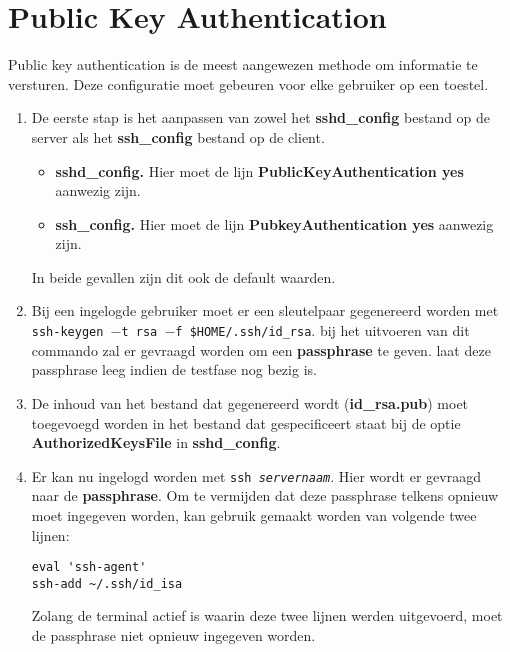 \documentclass{report}
\begin{document}
	\section{Public Key Authentication}
	Public key authentication is de meest aangewezen methode om informatie te versturen. Deze configuratie moet gebeuren voor elke gebruiker op een toestel.
	\begin{enumerate}
		\item De eerste stap is het aanpassen van zowel het \textbf{sshd\_config} bestand op de server als het \textbf{ssh\_config} bestand op de client.
		\begin{itemize}
			\item \textbf{sshd\_config.} Hier moet de lijn \textbf{PublicKeyAuthentication  yes} aanwezig zijn. 
			\item \textbf{ssh\_config.} Hier moet de lijn \textbf{PubkeyAuthentication  yes} aanwezig zijn.
		\end{itemize}
		In beide gevallen zijn dit ook de default waarden.
		\item Bij een ingelogde gebruiker moet er een sleutelpaar gegenereerd worden met \texttt{ssh-keygen $-$t rsa $-$f \$HOME/.ssh/id\_rsa}. bij het uitvoeren van dit commando zal er gevraagd worden om een \textbf{passphrase} te geven. laat deze passphrase leeg indien de testfase nog bezig is.
	
		\item De inhoud van het bestand dat gegenereerd wordt (\textbf{id\_rsa.pub}) moet toegevoegd worden in het bestand dat gespecificeert staat bij de optie \textbf{AuthorizedKeysFile} in \textbf{sshd\_config}. 
		
		\item Er kan nu ingelogd worden met \texttt{ssh \textit{servernaam}}. Hier wordt er gevraagd naar de \textbf{passphrase}. Om te vermijden dat deze passphrase telkens opnieuw moet ingegeven worden, kan gebruik gemaakt worden van volgende twee lijnen:
		\begin{lstlisting}
eval 'ssh-agent'
ssh-add ~/.ssh/id_isa 
		\end{lstlisting}
		Zolang de terminal actief is waarin deze twee lijnen werden uitgevoerd, moet de passphrase niet opnieuw ingegeven worden.
	\end{enumerate}
\end{document}
